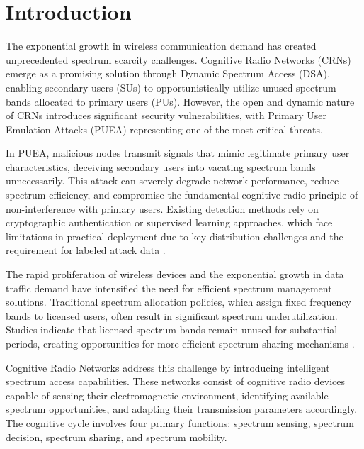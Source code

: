 \documentclass[pdflatex,sn-mathphys-num]{sn-jnl}%
\theoremstyle{thmstyleone}
\theoremstyle{thmstyletwo}
\theoremstyle{thmstylethree}
\begin{document}


\maketitle

\section{Introduction}\label{sec1}

The exponential growth in wireless communication demand has created unprecedented spectrum scarcity challenges. Cognitive Radio Networks (CRNs) \cite{ref2} emerge as a promising solution through Dynamic Spectrum Access (DSA), enabling secondary users (SUs) to opportunistically utilize unused spectrum bands allocated to primary users (PUs). However, the open and dynamic nature of CRNs introduces significant security vulnerabilities, with Primary User Emulation Attacks (PUEA) representing one of the most critical threats.

In PUEA, malicious nodes transmit signals that mimic legitimate primary user characteristics, deceiving secondary users into vacating spectrum bands unnecessarily. This attack can severely degrade network performance, reduce spectrum efficiency, and compromise the fundamental cognitive radio principle of non-interference with primary users. Existing detection methods rely on cryptographic authentication or supervised learning approaches, which face limitations in practical deployment due to key distribution challenges and the requirement for labeled attack data \cite{ref5,ref9}.

The rapid proliferation of wireless devices and the exponential growth in data traffic demand have intensified the need for efficient spectrum management solutions. Traditional spectrum allocation policies, which assign fixed frequency bands to licensed users, often result in significant spectrum underutilization. Studies indicate that licensed spectrum bands remain unused for substantial periods, creating opportunities for more efficient spectrum sharing mechanisms \cite{ref1}.

Cognitive Radio Networks address this challenge by introducing intelligent spectrum access capabilities. These networks consist of cognitive radio devices capable of sensing their electromagnetic environment, identifying available spectrum opportunities, and adapting their transmission parameters accordingly. The cognitive cycle involves four primary functions: spectrum sensing, spectrum decision, spectrum sharing, and spectrum mobility.
\end{document}
